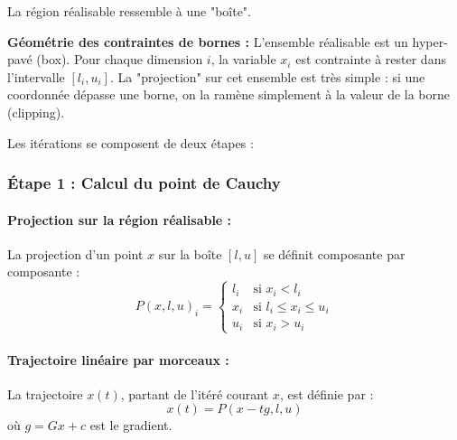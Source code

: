 La région réalisable ressemble à une "boîte".

\begin{center}
\end{center}

\begin{figureexplanation}
\textbf{Géométrie des contraintes de bornes :}
L'ensemble réalisable est un hyper-pavé (box). Pour chaque dimension $i$, la variable $x_i$ est contrainte à rester dans l'intervalle $[l_i, u_i]$.
La "projection" sur cet ensemble est très simple : si une coordonnée dépasse une borne, on la ramène simplement à la valeur de la borne (clipping).
\end{figureexplanation}

Les itérations se composent de deux étapes :

\subsubsection{Étape 1 : Calcul du point de Cauchy}

\paragraph{Projection sur la région réalisable :}
La projection d'un point $x$ sur la boîte $[l, u]$ se définit composante par composante :
\begin{equation}
    P(x, l, u)_i = \begin{cases}
        l_i & \text{si } x_i < l_i \\
        x_i & \text{si } l_i \le x_i \le u_i \\
        u_i & \text{si } x_i > u_i
    \end{cases}
\end{equation}

\paragraph{Trajectoire linéaire par morceaux :}
La trajectoire $x(t)$, partant de l'itéré courant $x$, est définie par :
\begin{equation}
    x(t) = P(x - tg, l, u)
\end{equation}
où $g = Gx + c$ est le gradient.


